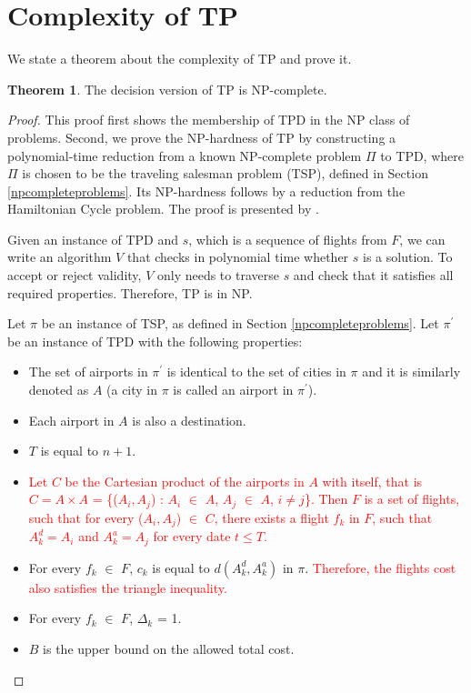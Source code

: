 \documentclass{article}
\theoremstyle{definition}
\newtheorem{theorem}{Theorem}
\begin{document}
\section{Complexity of TP}

We state a theorem about the complexity of TP and prove it.

\begin{theorem}
The decision version of TP is NP-complete.
\end{theorem}

\begin{proof}
\label{npcompleteproof}
This proof first shows the membership of TPD in the NP class of problems. Second, we prove the NP-hardness of TP by constructing a polynomial-time reduction from a known NP-complete problem $\Pi$ to TPD, where $\Pi$ is chosen to be the traveling salesman problem (TSP), defined in Section \ref{npcompleteproblems}. Its NP-hardness follows by a reduction from the Hamiltonian Cycle problem. The proof is presented by \cite{thebible}.

Given an instance of TPD and $s$, which is a sequence of flights from $F$, we can write an algorithm $V$ that checks in polynomial time whether $s$ is a solution. To accept or reject validity, $V$ only needs to traverse $s$ and check that it satisfies all required properties. Therefore, TP is in NP.

Let $\pi$ be an instance of TSP, as defined in Section \ref{npcompleteproblems}. Let $\pi^{\prime}$ be an instance of TPD with the following properties:
\begin{itemize}
\item The set of airports in $\pi^{\prime}$ is identical to the set of cities in $\pi$ and it is similarly denoted as $A$ (a city in $\pi$ is called an airport in $\pi^{\prime}$).
\item Each airport in $A$ is also a destination.
\item $T$ is equal to $n+1$.
\item \textcolor{red}{Let $C$ be the Cartesian product of the airports in $A$ with itself, that is $C = A \times A$ = \{($A_{i}, A_{j}$) : $A_{i}$ $\in$ $A$, $A_{j}$ $\in$ $A$, $i \neq j$\}. Then $F$ is a set of flights, such that for every ($A_{i}, A_{j}$) $\in$ $C$, there exists a flight $f_{k}$ in $F$, such that $A^{d}_{k} = A_{i}$ and $A^{a}_{k} = A_{j}$ for every date $t \leq T$.}
\item For every $f_{k}$ $\in$ $F$, $c_{k}$ is equal to $d(A^{d}_{k}, A^{a}_{k})$ in $\pi$. \textcolor{red}{Therefore, the flights cost also satisfies the triangle inequality.} 
\item For every $f_{k}$ $\in$ $F$, $\Delta_{k}$ = 1.
\item $B$ is the upper bound on the allowed total cost.
\end{itemize}


\end{proof}
\end{document}
